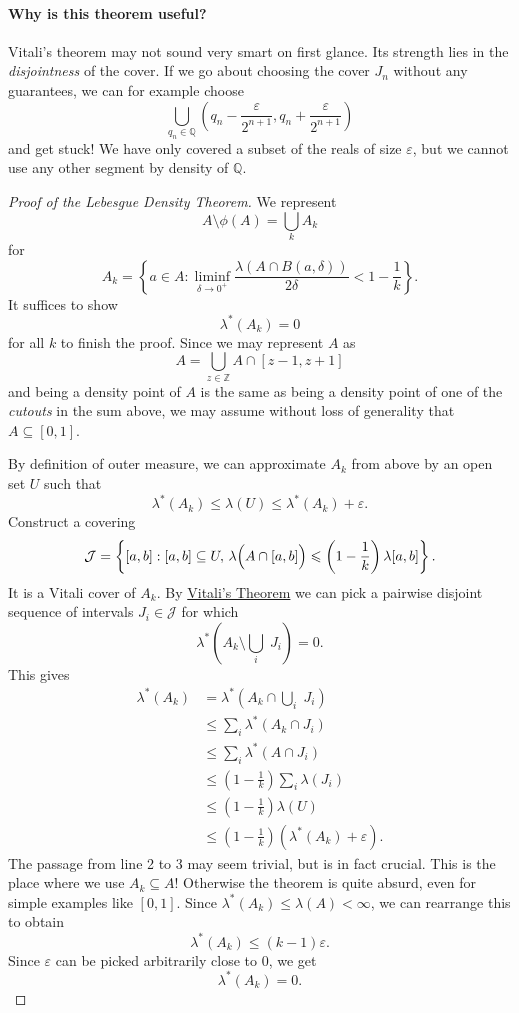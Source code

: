 \paragraph{Why is this theorem useful?} Vitali's theorem may not sound very smart on first glance. Its strength lies in the \emph{disjointness} of the cover. If we go about choosing the cover \( J_n \) without any guarantees, we can for example choose
\[ 
    \bigcup_{q_n \in \mathbb{Q}} \left(q_n - \frac{\varepsilon}{2^{n+1}}, q_n + \frac{\varepsilon }{2^{n+1}}\right) 
\]
and get stuck! We have only covered a subset of the reals of size \(\varepsilon \), but we cannot use any other segment by density of \( \mathbb{Q} \).
\begin{proof}[Proof of the Lebesgue Density Theorem]
    We represent
    \[ 
    A \setminus \phi(A) = \bigcup_k A_k      
   \]
   for
   \[ 
       A_k = \left\{ a \in A : \liminf_{\delta \to 0^+} \frac{\lambda(A \cap B(a,\delta))}{2\delta} < 1 - \frac{1}{k} \right\}.
  \]
  It suffices to show
  \[ 
     \lambda^*(A_k) = 0 
 \]
 for all \( k \) to finish the proof. Since we may represent \( A \) as
 \[ 
     A = \bigcup_{z \in \mathbb{Z}} A \cap [z-1, z+1] 
\]
and being a density point of \( A \) is the same as being a density point of one of the \emph{cutouts} in the sum above, we may assume without loss of generality that \( A \subseteq [0,1] \).

By definition of outer measure, we can approximate \( A_k \) from above by an open set \( U \) such that
\[ 
    \lambda^*(A_k) \leqslant \lambda(U) \leqslant \lambda^*(A_k) + \varepsilon.
\]
Construct a covering
\[ 
    \mathcal{J} = \left\{ [a,b] : [a,b] \subseteq U,\,\lambda\Bigl(A \cap [a,b]\Bigr) \leqslant \left(1 - \frac{1}{k}\right)\lambda[a,b]\right\}.
\]
It is a Vitali cover of \( A_k \). By \hyperlink{VitaliCoveringTheorem}{Vitali's Theorem} we can pick a pairwise disjoint sequence of intervals \( J_i \in \mathcal{J}\) for which
\[ 
    \lambda^*\left( A_k \setminus \bigcup_i\; J_i\right) = 0.
\]
This gives
\begin{align*}
    \lambda^* (A_k) &=\lambda^*\left(A_k \cap \bigcup_i \; J_i \right) \\
                    &\leqslant \sum_i \lambda^*(A_k \cap J_i ) \\
                    &\leqslant \sum_i \lambda^*(A \cap J_i ) \\
                    &\leqslant \left( 1 - \frac{1}{k} \right) \sum_i\lambda(J_i) \\
                    &\leqslant \left( 1 - \frac{1}{k} \right)\lambda(U) \\
                    &\leqslant \left( 1 - \frac{1}{k} \right) \left(\lambda^*(A_k) +\varepsilon \right).
\end{align*}
The passage from line 2 to 3 may seem trivial, but is in fact crucial. This is the place where we use \( A_k \subseteq A \)! Otherwise the theorem is quite absurd, even for simple examples like \( [0,1] \). Since \( \lambda^*(A_k) \leqslant\lambda(A) < \infty \), we can rearrange this to obtain
\[ 
   \lambda^*(A_k) \leqslant (k-1)\varepsilon. 
\]
Since \(\varepsilon \) can be picked arbitrarily close to 0, we get
\[ 
   \lambda^*(A_k) = 0. 
\]


\end{proof}

